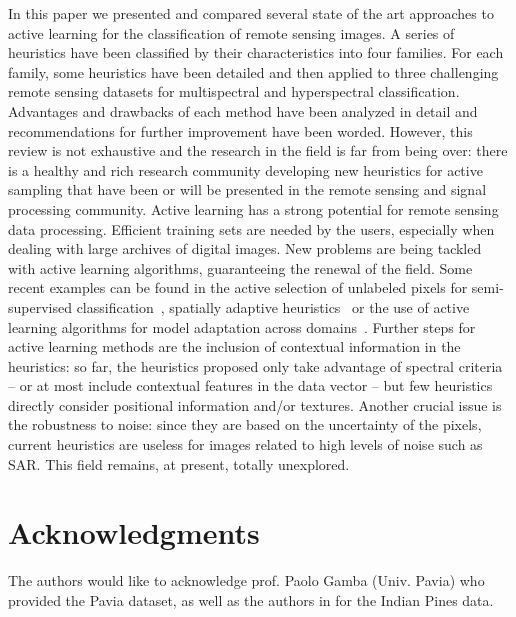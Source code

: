 \label{sec:concl}
In this paper we presented and compared several state of the art approaches to active learning for the classification of remote sensing images. A series of heuristics have been classified by their characteristics into four families. For each family, some heuristics have been detailed and then applied to {three challenging} remote sensing datasets for multispectral and hyperspectral  classification. Advantages and drawbacks of each method have been analyzed in detail and recommendations for further improvement have been worded. 
However, this review is not exhaustive and the research in the field is far from being over:  
there is a healthy and rich research community developing new heuristics for active sampling that have been or will be presented in the remote sensing and signal processing community. 
Active learning has a strong potential for remote sensing data processing. Efficient training sets are needed by the users, especially when dealing with large archives of digital images. New problems are being tackled with active learning algorithms, guaranteeing the renewal of the field. Some recent examples can be found in the active selection of unlabeled pixels for semi-supervised classification~,  spatially adaptive heuristics~ or the use of active learning algorithms for model adaptation across domains~. 
Further steps for active learning methods are the inclusion  of  contextual information in the heuristics: so far, the heuristics proposed only take advantage of spectral criteria -- or at most include contextual features in the data vector -- but few heuristics directly consider positional information and/or textures.  Another crucial issue is the robustness to noise: since they are based on the uncertainty of the pixels, current heuristics are useless for images related to high levels of noise such as SAR. This field remains, at present, totally unexplored.
\section*{Acknowledgments}
The authors would like to acknowledge prof. Paolo Gamba (Univ. Pavia) who provided the Pavia dataset, as well as the authors in  for the Indian Pines data.


